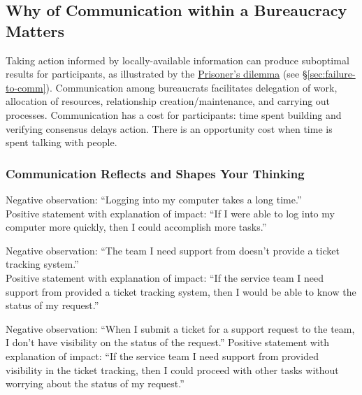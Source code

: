 \subsection{Why of Communication within a Bureaucracy Matters}

Taking action informed by locally-available information can produce suboptimal results for participants, as illustrated by the \href{https://en.wikipedia.org/wiki/Prisoner\%27s\_dilemma}{Prisoner's dilemma} (see \S\ref{sec:failure-to-comm}). Communication among bureaucrats facilitates delegation of work, allocation of resources, relationship creation/maintenance, and carrying out processes. Communication has a cost for participants: time spent building and verifying consensus delays action. There is an opportunity cost when time is spent talking with people.




\subsubsection{Communication Reflects and Shapes Your Thinking}

Negative observation: ``Logging into my computer takes a long time.''\\
Positive statement with explanation of impact: ``If I were able to log into my computer more quickly, then I could accomplish more tasks.''

Negative observation: ``The team I need support from doesn't provide a ticket tracking system.''\\
Positive statement with explanation of impact: ``If the service team I need support from provided a ticket tracking system, then I would be able to know the status of my request.''

Negative observation: ``When I submit a ticket for a support request to the team, I don't have visibility on the status of the request.''
Positive statement with explanation of impact: ``If the service team I need support from provided visibility in the ticket tracking, then I could proceed with other tasks without worrying about the status of my request.''
